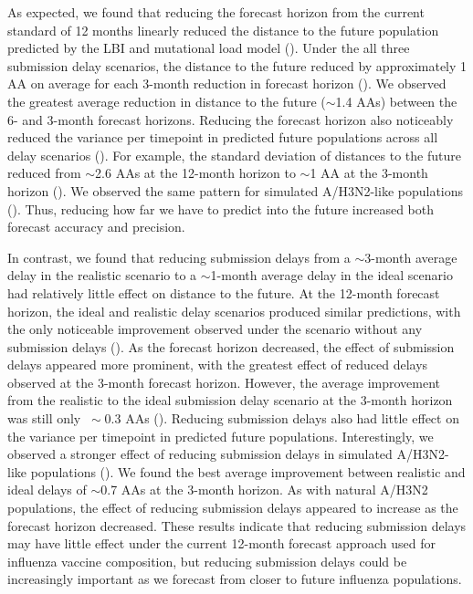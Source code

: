 \documentclass[9pt,lineno]{elife}
\begin{document}
As expected, we found that reducing the forecast horizon from the current standard of 12 months linearly reduced the distance to the future population predicted by the LBI and mutational load model ().
Under the all three submission delay scenarios, the distance to the future reduced by approximately 1 AA on average for each 3-month reduction in forecast horizon ().
We observed the greatest average reduction in distance to the future ($\sim$1.4 AAs) between the 6- and 3-month forecast horizons.
Reducing the forecast horizon also noticeably reduced the variance per timepoint in predicted future populations across all delay scenarios ().
For example, the standard deviation of distances to the future reduced from $\sim$2.6 AAs at the 12-month horizon to $\sim$1 AA at the 3-month horizon ().
We observed the same pattern for simulated A/H3N2-like populations ().
Thus, reducing how far we have to predict into the future increased both forecast accuracy and precision.

In contrast, we found that reducing submission delays from a $\sim$3-month average delay in the realistic scenario to a $\sim$1-month average delay in the ideal scenario had relatively little effect on distance to the future.
At the 12-month forecast horizon, the ideal and realistic delay scenarios produced similar predictions, with the only noticeable improvement observed under the scenario without any submission delays ().
As the forecast horizon decreased, the effect of submission delays appeared more prominent, with the greatest effect of reduced delays observed at the 3-month forecast horizon.
However, the average improvement from the realistic to the ideal submission delay scenario at the 3-month horizon was still only $~\sim$0.3 AAs ().
Reducing submission delays also had little effect on the variance per timepoint in predicted future populations.
Interestingly, we observed a stronger effect of reducing submission delays in simulated A/H3N2-like populations ().
We found the best average improvement between realistic and ideal delays of $\sim$0.7 AAs at the 3-month horizon.
As with natural A/H3N2 populations, the effect of reducing submission delays appeared to increase as the forecast horizon decreased.
These results indicate that reducing submission delays may have little effect under the current 12-month forecast approach used for influenza vaccine composition, but reducing submission delays could be increasingly important as we forecast from closer to future influenza populations.
\end{document}
